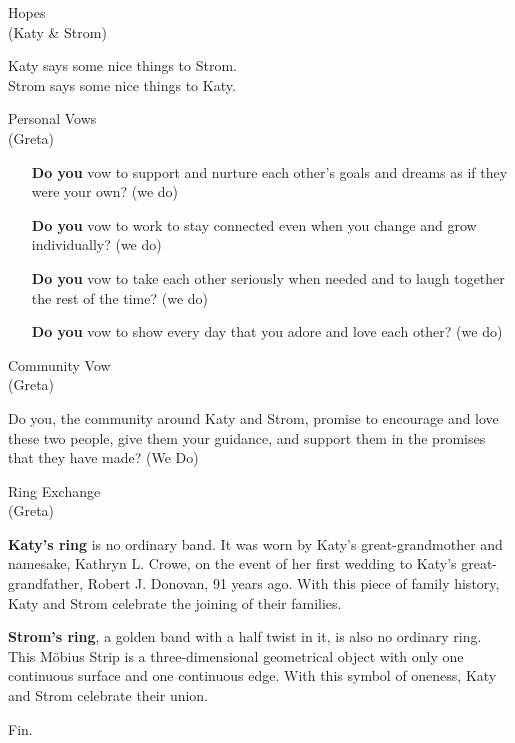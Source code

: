 \documentclass[11pt]{article}
\newcommand*\ColText[1]{\textcolor{Goldenrod3}{#1}}
\newcommand*\heading[2]{%
    \vspace{2.0em}
    {\fontsize{24}{29}\selectfont\ColText{#1}}\\
    {\fontsize{14}{14}\selectfont\ColText{(#2)}}\\\vspace{2.0em}}
\begin{document}
\begin{center}
\pagebreak
\heading{Hopes}{Katy \& Strom}

Katy says some nice things to Strom.\\
Strom says some nice things to Katy.

\heading{Personal Vows}{Greta}

\begin{itemize}
\item[\textbf{Do you}] vow to support and nurture each other’s goals and dreams as if they were your own? (we do)
\item[\textbf{Do you}] vow to work to stay connected even when you change and grow individually? (we do)
\item[\textbf{Do you}] vow to take each other seriously when needed and to laugh together the rest of the time? (we do)
\item[\textbf{Do you}] vow to show every day that you adore and love each other? (we do)
\end{itemize}

\heading{Community Vow}{Greta}

Do you, the community around Katy and Strom, promise to encourage and love 
these two people, give them your guidance, and support them in the promises 
that they have made? (We Do) 

\pagebreak 
\heading{Ring Exchange}{Greta}

\textbf{Katy's ring} is no ordinary band. It was worn by Katy’s 
great-grandmother and namesake, Kathryn L. Crowe, on the event of her first 
wedding to Katy’s great-grandfather, Robert J. Donovan, 91 years ago. With this 
piece of family history, Katy and Strom celebrate the joining of their 
families.

\vspace{5mm}

\textbf{Strom's ring}, a golden band with a half twist in it, is also no ordinary ring. 
This M{\"o}bius Strip is a three-dimensional geometrical object with only one 
continuous surface and one continuous edge. With this symbol of oneness, Katy 
and Strom celebrate 
their union.

\newpage

Fin.
\end{center}
\end{document}
